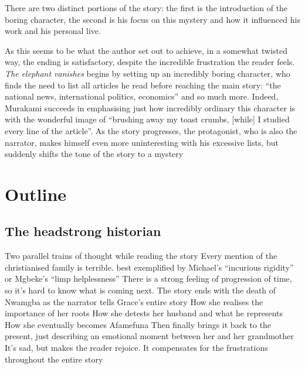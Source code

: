 \documentclass[12pt,a4paper]{article}
\begin{document}
There are two distinct portions of the story: the first is the introduction of the boring character, the second is his focus on this mystery and how it influenced his work and his personal live. 

As this seems to be what the author set out to achieve, in a somewhat twisted way, the ending is satisfactory, despite the incredible frustration the reader feels. \textit{The elephant vanishes} begins by setting up an incredibly boring character, who finds the need to list all articles he read before reaching the main story: ``the national news, international politics, economics'' and so much more. Indeed, Murakami succeeds in emphasising just how incredibly ordinary this character is with the wonderful image of ``brushing away my toast crumbs, [while] I studied every line of the article''. As the story progresses, the protagonist, who is also the narrator, makes himself even more uninteresting with his excessive lists, but suddenly shifts the tone of the story to a mystery

\section{Outline}
\subsection{The headstrong historian}
\begin{outline}[enumerate]
    \1 Two parallel trains of thought while reading the story
        \2 Every mention of the christianised family is terrible.
            \3 best exemplified by Michael's ``incurious rigidity'' or Mgbeke's ``limp helplessness''
        \2 There is a strong feeling of progression of time, so it's hard to know what is coming next. 
    \1 The story ends with the death of Nwamgba as the narrator tells Grace's entire story
        \2 How she realises the importance of her roots
        \2 How she detests her husband and what he represents
        \2 How she eventually becomes Afamefuna
    \1 Then finally brings it back to the present, just describing an emotional moment between her and her grandmother
        \2 It's sad, but makes the reader rejoice.
        \2 It compensates for the frustrations throughout the entire story
\end{outline}
\end{document}
